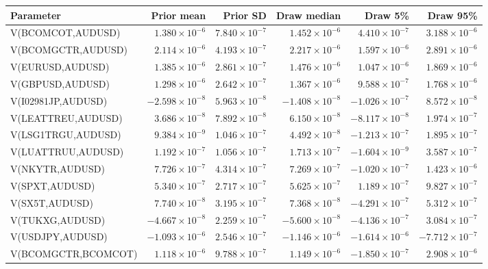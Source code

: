 \documentclass[10pt,a4paper]{article}
\begin{document}
\begin{tabular*}{\linewidth}{@{\extracolsep{\fill}}lrrrrr@{}}
\toprule
Parameter & Prior mean & Prior SD & Draw median & Draw 5\% & Draw 95\%\\
\midrule
V(BCOMCOT,AUDUSD) & $1.380\times10^{-6}$ & $7.840\times10^{-7}$ & $1.452\times10^{-6}$ & $4.410\times10^{-7}$ & $3.188\times10^{-6}$ \\
V(BCOMGCTR,AUDUSD) & $2.114\times10^{-6}$ & $4.193\times10^{-7}$ & $2.217\times10^{-6}$ & $1.597\times10^{-6}$ & $2.891\times10^{-6}$ \\
V(EURUSD,AUDUSD) & $1.385\times10^{-6}$ & $2.861\times10^{-7}$ & $1.476\times10^{-6}$ & $1.047\times10^{-6}$ & $1.869\times10^{-6}$ \\
V(GBPUSD,AUDUSD) & $1.298\times10^{-6}$ & $2.642\times10^{-7}$ & $1.367\times10^{-6}$ & $9.588\times10^{-7}$ & $1.768\times10^{-6}$ \\
V(I02981JP,AUDUSD) & $-2.598\times10^{-8}$ & $5.963\times10^{-8}$ & $-1.408\times10^{-8}$ & $-1.026\times10^{-7}$ & $8.572\times10^{-8}$ \\
V(LEATTREU,AUDUSD) & $3.686\times10^{-8}$ & $7.892\times10^{-8}$ & $6.150\times10^{-8}$ & $-8.117\times10^{-8}$ & $1.974\times10^{-7}$ \\
V(LSG1TRGU,AUDUSD) & $9.384\times10^{-9}$ & $1.046\times10^{-7}$ & $4.492\times10^{-8}$ & $-1.213\times10^{-7}$ & $1.895\times10^{-7}$ \\
V(LUATTRUU,AUDUSD) & $1.192\times10^{-7}$ & $1.056\times10^{-7}$ & $1.713\times10^{-7}$ & $-1.604\times10^{-9}$ & $3.587\times10^{-7}$ \\
V(NKYTR,AUDUSD) & $7.726\times10^{-7}$ & $4.314\times10^{-7}$ & $7.269\times10^{-7}$ & $-1.020\times10^{-7}$ & $1.423\times10^{-6}$ \\
V(SPXT,AUDUSD) & $5.340\times10^{-7}$ & $2.717\times10^{-7}$ & $5.625\times10^{-7}$ & $1.189\times10^{-7}$ & $9.827\times10^{-7}$ \\
V(SX5T,AUDUSD) & $7.740\times10^{-8}$ & $3.195\times10^{-7}$ & $7.368\times10^{-8}$ & $-4.291\times10^{-7}$ & $5.312\times10^{-7}$ \\
V(TUKXG,AUDUSD) & $-4.667\times10^{-8}$ & $2.259\times10^{-7}$ & $-5.600\times10^{-8}$ & $-4.136\times10^{-7}$ & $3.084\times10^{-7}$ \\
V(USDJPY,AUDUSD) & $-1.093\times10^{-6}$ & $2.546\times10^{-7}$ & $-1.146\times10^{-6}$ & $-1.614\times10^{-6}$ & $-7.712\times10^{-7}$ \\
V(BCOMGCTR,BCOMCOT) & $1.118\times10^{-6}$ & $9.788\times10^{-7}$ & $1.149\times10^{-6}$ & $-1.850\times10^{-7}$ & $2.908\times10^{-6}$ \\

\end{tabular*}
\end{document}
